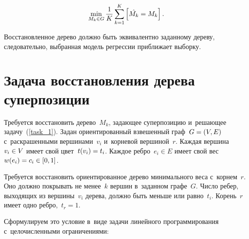 \begin{multicols}{2}
\vspace*{-3pt}

\noindent
$$
\min_{M_k \in G} \displaystyle\frac{\displaystyle 1\mathstrut}{\displaystyle K\mathstrut}\sum\limits_{k=1}^K \left[ \hat{M_k} = M_k\right].
$$

\vspace*{-4pt}

\noindent
Восстановленное дерево должно быть эквивалентно заданному дереву, следовательно, 
выбранная модель регрессии при\-бли\-жа\-ет выборку.

\vspace*{-10pt}

\section{Задача восстановления дерева суперпозиции}

\vspace*{-3pt}

Требуется восстановить дерево~$M_k$, задающее  суперпозицию и~решающее 
задачу~(\ref{task_1}). Задан ориентированный взвешенный граф~$G\hm=(V,E)$ 
с~раскрашенными вершинами~$v_i$ и~корневой вершиной~$r$. Каждая вершина~$v_i \hm\in 
V$ имеет свой цвет~$t(v_i)\hm=t_i$. Каждое реб\-ро~$e_i\in E$ имеет свой 
вес~\mbox{$w(e_i)\hm=c_i\hm\in[0,1]$}.

Требуется восстановить ориентированное дерево минимального веса с~корнем~$r$. 
Оно должно покрывать не менее~$k$ вершин в~заданном графе~$G$. Чис\-ло ребер, 
выходящих из вершины~$v_i$ дерева, должно быть меньше или равно~$t_i$. 
Корень~$r$ имеет одно ребро,~$t_r=1$.

Сформулируем это условие в~виде задачи линейного программирования 
с~целочисленными ограничениями:

\vspace*{-5pt}


\end{multicols}
